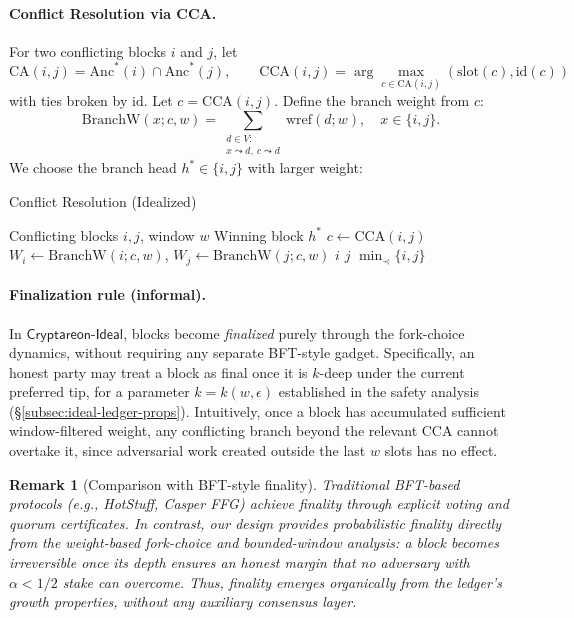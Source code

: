 \documentclass[11pt]{article}
\newtheorem{remark}[theorem]{Remark}
\newcommand{\ProjIdeal}{\ensuremath{\mathsf{Cryptareon\text{-}Ideal}}\xspace}
\newcommand{\id}{\ensuremath{\mathrm{id}}\xspace}
\newcommand{\slot}{\ensuremath{\mathrm{slot}}\xspace}
\newcommand{\Anc}{\ensuremath{\mathrm{Anc}}\xspace}
\newcommand{\wref}{\ensuremath{\mathrm{wref}}\xspace}
\newcommand{\BranchW}{\ensuremath{\mathrm{BranchW}}\xspace}
\newcommand{\CA}{\ensuremath{\mathrm{CA}}\xspace}
\newcommand{\CCA}{\ensuremath{\mathrm{CCA}}\xspace}
\begin{document}
\paragraph{Conflict Resolution via CCA.} For two conflicting blocks $i$ and $j$, let 
\begin{equation*}
\CA(i,j)=\Anc^*(i)\cap \Anc^*(j),\qquad
\CCA(i,j)=\arg\max_{c\in \CA(i,j)}(\slot(c),\id(c))
\end{equation*}
with ties broken by $\id$. Let $c=\CCA(i,j)$. Define the branch weight from $c$:
\begin{equation*}
\BranchW(x; c, w) = \sum_{\substack{d\in V:\\ x\leadsto d,\ c\leadsto d}} \wref(d;w),\quad x\in\{i,j\}.
\end{equation*}
We choose the branch head $h^*\in\{i,j\}$ with larger weight:

\begin{algorithm}[H]
\caption{Conflict Resolution (Idealized)}
\label{alg:ideal-cca}
\begin{algorithmic}[1]
\Require Conflicting blocks $i,j$, window $w$
\Ensure Winning block $h^*$
\State $c \gets \CCA(i,j)$
\State $W_i\gets\BranchW(i;c,w)$, \quad $W_j\gets\BranchW(j;c,w)$
 \Return $i$
 \Return $j$
\Else \Return $\min\nolimits_{\prec}\{i,j\}$ 
\EndIf
\end{algorithmic}
\end{algorithm}



\paragraph{Finalization rule (informal).}
In \ProjIdeal, blocks become \emph{finalized} purely through the fork-choice dynamics,
without requiring any separate BFT-style gadget.
Specifically, an honest party may treat a block as final once it is
$k$-deep under the current preferred tip, for a parameter
$k=k(w,\epsilon)$ established in the safety analysis
(\S\ref{subsec:ideal-ledger-props}).
Intuitively, once a block has accumulated sufficient window-filtered weight,
any conflicting branch beyond the relevant CCA cannot overtake it,
since adversarial work created outside the last $w$ slots has no effect.

\begin{remark}[Comparison with BFT-style finality]
Traditional BFT-based protocols (e.g., HotStuff, Casper FFG) achieve finality
through explicit voting and quorum certificates.
In contrast, our design provides \emph{probabilistic finality} directly from
the weight-based fork-choice and bounded-window analysis:
a block becomes irreversible once its depth ensures an honest margin
that no adversary with $\alpha < 1/2$ stake can overcome.
Thus, finality emerges organically from the ledger’s growth properties,
without any auxiliary consensus layer.
\end{remark}
\end{document}
